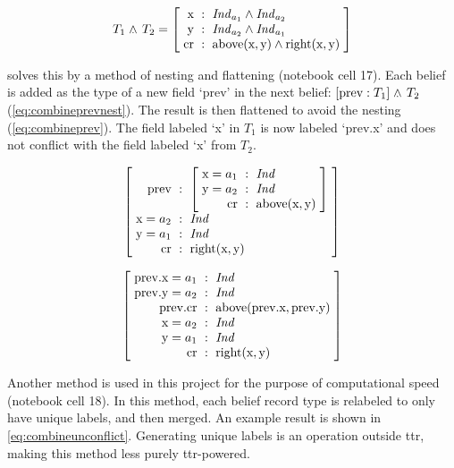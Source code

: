 \begin{equation} \label{eq:merge}
T_1  \ttrmerge T_2 =
\rec{
    \text{x} &:& \type{Ind}_{a_1} \wedge \type{Ind}_{a_2} \\
    \text{y} &:& \type{Ind}_{a_2} \wedge \type{Ind}_{a_1} \\
    \text{cr} &:& \text{above}(\text{x}, \text{y}) \wedge \text{right}(\text{x}, \text{y})
    }
\end{equation}

\cite{CooperTypetheorylanguage2016} solves this by a method of nesting and flattening (notebook cell 17).
Each belief is added as the type of a new field `prev' in the next belief: $[\text{prev} : T_1] \mathrel{\wedge_{\mkern-10mu\cdot\mkern6mu}} T_2$ (\autoref{eq:combineprevnest}).
The result is then flattened to avoid the nesting (\autoref{eq:combineprev}).
The field labeled `x' in $T_1$ is now labeled `prev.x' and does not conflict with the field labeled `x' from $T_2$.

\begin{equation} \label{eq:combineprevnest}
\rec{
    \text{prev} &:& \rec{
        \text{x}=a_1 &:& \type{Ind} \\
	\text{y}=a_2 &:& \type{Ind} \\
        \text{cr} &:& \text{above}(\text{x}, \text{y}) \\
        } \\
    \text{x}=a_2 &:& \type{Ind} \\
    \text{y}=a_1 &:& \type{Ind} \\
    \text{cr} &:& \text{right}(\text{x}, \text{y})
    }
\end{equation}

\begin{equation} \label{eq:combineprev}
\rec{
    \text{prev.x}=a_1 &:& \type{Ind} \\
    \text{prev.y}=a_2 &:& \type{Ind} \\
    \text{prev.cr} &:& \text{above}(\text{prev.x}, \text{prev.y}) \\
    \text{x}=a_2 &:& \type{Ind} \\
    \text{y}=a_1 &:& \type{Ind} \\
    \text{cr} &:& \text{right}(\text{x}, \text{y})
    }
\end{equation}

Another method is used in this project for the purpose of computational speed (notebook cell 18).
In this method, each belief record type is relabeled to only have unique labels, and then merged.
An example result is shown in \autoref{eq:combineunconflict}.
Generating unique labels is an operation outside \gls{ttr}, making this method less purely \gls{ttr}-powered.

